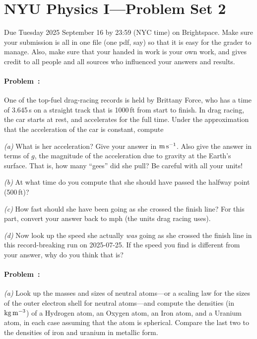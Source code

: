 \documentclass[12pt]{article}
\begin{document}
\section*{NYU Physics I---Problem Set 2}

Due Tuesday 2025 September 16 by 23:59 (NYC time) on Brightspace. Make sure
your submission is all in one file (one pdf, say) so that it is easy for
the grader to manage. Also, make sure that your handed in work is your
own work, and gives credit to all people and all sources who influenced
your answers and results.

\paragraph{Problem~\theproblem:}%
One of the top-fuel drag-racing records is held by Brittany Force, who has a
time of 3.645\,s on a straight track that is 1000\,ft from start to finish.
In drag racing, the car starts at rest, and accelerates for the full time.
Under the approximation that the acceleration of the car is constant, compute

\textsl{(a)} What is her acceleration? Give your answer in $\mathrm{m}\,\mathrm{s}^{-1}$.
Also give the answer in terms of $g$, the magnitude of the acceleration due
to gravity at the Earth's surface. That is, how many ``gees'' did she pull?
Be careful with all your units!

\textsl{(b)} At what time do you compute that she should have passed the halfway point (500\,ft)?

\textsl{(c)} How fast should she have been going as she crossed the finish line?
For this part, convert your answer back to mph (the units drag racing uses).

\textsl{(d)} Now look up the speed she actually \emph{was} going as she crossed
the finish line in this record-breaking run on 2025-07-25.
If the speed you find is different from your answer, why do you think that is?

\paragraph{Problem~\theproblem:}%
\textsl{(a)} Look up the masses and sizes of neutral atoms---or a
scaling law for the sizes of the outer electron shell for neutral
atoms---and compute the densities (in $\mathrm{kg}\,\mathrm{m}^{-3}$) of a Hydrogen
atom, an Oxygen atom, an Iron atom, and a Uranium atom, in each case
assuming that the atom is spherical. Compare the
last two to the densities of iron and uranium in metallic form.
\end{document}
